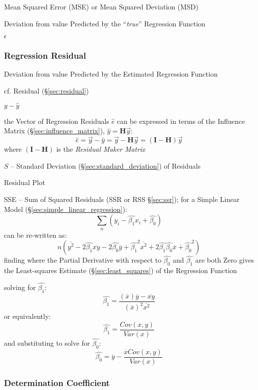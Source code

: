 Mean Squared Error (MSE) or Mean Squared Deviation (MSD)

Deviation from value Predicted by the ``\emph{true}'' Regression Function

$\epsilon$



\subsubsection{Regression Residual}\label{sec:regression_residual}

Deviation from value Predicted by the Estimated Regression Function

\fist cf. Residual (\S\ref{sec:residual})

$y - \hat{y}$

the Vector of Regression Residuals $\hat{e}$ can be expressed in terms of the
Influence Matrix (\S\ref{sec:influence_matrix}), $\hat{y} = \mathbf{H}\vec{y}$:
\[
  \hat{e} = \vec{y} - \hat{y} = \vec{y} - \mathbf{H}\vec{y} =
    (\mathbf{I} - \mathbf{H})\vec{y}
\]
where $(\mathbf{I} - \mathbf{H})$ is the \emph{Residual Maker Matrix}

$S$ -- Standard Deviation (\S\ref{sec:standard_deviation}) of Residuals

Residual Plot

SSE -- Sum of Squared Residuals (SSR or RSS \S\ref{sec:ssr}); for a Simple
Linear Model (\S\ref{sec:simple_linear_regression}):
\[
  \sum_n (y_i - \hat{\beta_1} x_i + \hat{\beta_0})
\]
can be re-written as:
\[
  n (\overline{y^2} - 2 \hat{\beta_1} \overline{x y}
    - 2 \hat{\beta_0} \overline{y} + \hat{\beta_1}^2 \overline{x^2}
    + 2 \hat{\beta_1} \hat{\beta_0} \overline{x} + \hat{\beta_0}^2)
\]
finding where the Partial Derivative with respect to $\hat{\beta_0}$ and
$\hat{\beta_1}$ are both Zero gives the Least-squares Estimate
(\S\ref{sec:least_squares}) of the Regression Function

solving for $\hat{\beta_1}$:
\[
  \hat{\beta_1} = \frac{
    (\overline{x})\overline{y} - \overline{xy}
  }{
    (\overline{x})^2 \overline{x^2}
  }
\]
or equivalently:
\[
  \hat{\beta_1} = \frac{
    Cov(x,y)
  }{
    Var(x)
  }
\]
and substituting to solve for $\hat{\beta_0}$:
\[
  \hat{\beta_0} = \overline{y} - \frac{
    \overline{x} Cov(x,y)
  }{
    Var(x)
  }
\]



\subsubsection{Determination Coefficient}\label{sec:determination_coefficient}

